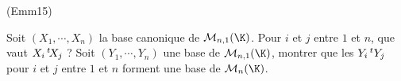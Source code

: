 \begin{tiny}(Emm15)\end{tiny} Soit $(X_1,\cdots,X_n)$ la base canonique de $\mathcal{M}_{n,1}(\K)$. Pour $i$ et $j$ entre $1$ et $n$, que vaut $X_i\,\mathstrut^t\!X_j$ ? Soit $(Y_1,\cdots,Y_n)$ une base de $\mathcal{M}_{n,1}(\K)$, montrer que les $Y_i\,\mathstrut^t Y_j$ pour $i$ et $j$ entre $1$ et $n$ forment une base de $\mathcal{M}_{n}(\K)$.